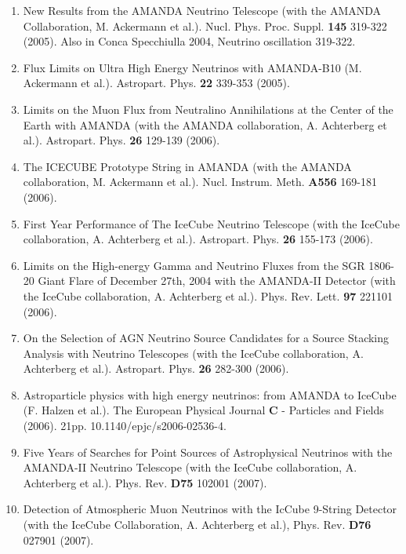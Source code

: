 \begin{enumerate}
\item New Results from the AMANDA Neutrino Telescope (with the AMANDA Collaboration, M. Ackermann et al.).  Nucl. Phys. Proc. Suppl. {\bf 145} 319-322 (2005). Also in Conca Specchiulla 2004, Neutrino oscillation 319-322.

\item Flux Limits on Ultra High Energy Neutrinos with AMANDA-B10 (M. Ackermann et al.).  Astropart. Phys. {\bf 22} 339-353 (2005).

\item Limits on the Muon Flux from Neutralino Annihilations at the Center of the Earth with AMANDA (with the AMANDA collaboration, A. Achterberg et al.).  Astropart. Phys. {\bf 26} 129-139 (2006).

\item The ICECUBE Prototype String in AMANDA (with the AMANDA collaboration, M. Ackermann et al.).  Nucl. Instrum. Meth. {\bf A556} 169-181 (2006).

\item First Year Performance of The IceCube Neutrino Telescope (with the IceCube collaboration, A. Achterberg et al.).  Astropart. Phys. {\bf 26} 155-173 (2006).

\item Limits on the High-energy Gamma and Neutrino Fluxes from the SGR 1806-20 Giant Flare of December 27th, 2004 with the AMANDA-II Detector (with the IceCube collaboration, A. Achterberg et al.).  Phys. Rev. Lett. {\bf 97} 221101 (2006).

\item On the Selection of AGN Neutrino Source Candidates for a Source Stacking Analysis with Neutrino Telescopes (with the IceCube collaboration, A. Achterberg et al.).  Astropart. Phys. {\bf 26} 282-300 (2006).

\item Astroparticle physics with high energy neutrinos: from AMANDA to IceCube (F. Halzen et al.).  The European Physical Journal {\bf C} - Particles and Fields (2006).  21pp.  10.1140/epjc/s2006-02536-4.

\item Five Years of Searches for Point Sources of Astrophysical Neutrinos with the AMANDA-II Neutrino Telescope (with the IceCube collaboration, A. Achterberg et al.).  Phys. Rev. {\bf D75} 102001 (2007).

\item Detection of Atmospheric Muon Neutrinos with the IcCube 9-String Detector (with the IceCube Collaboration, A.
Achterberg et al.), Phys. Rev. {\bf D76} 027901 (2007).


\end{enumerate}
